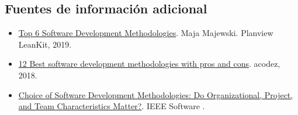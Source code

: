 \subsection{Fuentes de información adicional}
\begin{itemize}[nosep]
\item \href{https://leankit.com/blog/2019/03/top-6-software-development-methodologies/}{Top
  6 Software Development Methodologies}. Maja Majewski. Planview
  LeanKit, 2019.
\item \href{https://acodez.in/12-best-software-development-methodologies-pros-cons/}{12
  Best software development methodologies with pros and cons}. acodez,
  2018.
\item \href{https://www.computer.org/csdl/magazine/so/2016/05/mso2016050086/13rRUwh80B3}{Choice of Software Development Methodologies: Do Organizational, Project, and Team Characteristics Matter?}. IEEE Software \cite{Vijayasarathy_2016}.
\end{itemize}
